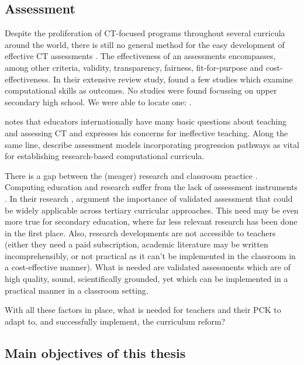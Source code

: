\subsection{Assessment}
Despite the proliferation of CT-focused programs throughout several curricula around the world, there is still no general method for the easy development of effective CT assessments \cite{catete2017framework}. The effectiveness of an assessments encompasses, among other criteria, validity, transparency, fairness, fit-for-purpose and cost-effectiveness.  In their extensive review study,  found a few studies which examine computational skills as outcomes. No studies were found focussing on upper secondary high school. We were able to locate one: .

 notes that educators internationally have many basic questions about teaching and assessing CT and expresses his concerns for ineffective teaching. Along the same line,  describe assessment models incorporating progression pathways as vital for establishing research-based computational curricula.


There is a gap between the (meager) research and classroom practice \cite{Yadav2015}. Computing education and research suffer from the lack of assessment instruments \cite{voogt2017effecten}. In their research , argument the importance of validated assessment that could be widely applicable across tertiary curricular approaches. This need may be even more true for secondary education, where far less relevant research has been done in the first place. Also, research developments are not accessible to teachers (either they need a paid subscription, academic literature may be written incomprehensibly, or not practical as it can't be implemented in the classroom in a cost-effective manner). What is needed are validated assessments which are of high quality, sound, scientifically grounded, yet which can be implemented in a practical manner in a classroom setting.

With all these factors in place, what is needed for teachers and their PCK to adapt to, and successfully implement, the curriculum reform?

\subsection{Main objectives of this thesis}


